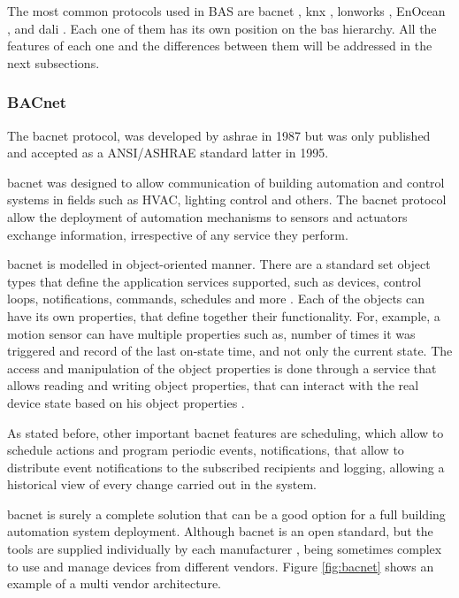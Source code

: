 The most common protocols used in BAS are \acf{bacnet} \cite{bacnet}, \acf{knx} \cite{knx}, \acf{lonworks} \cite{EchelonCorporation2009}, EnOcean \cite{enocean}, and \acf{dali} \cite{dali}. Each one of them has its own position on the \ac{bas} hierarchy. All the features of each one and the differences between them will be addressed in the next subsections.


\subsubsection{BACnet}
The \acf{bacnet} protocol, was developed by \acf{ashrae} in 1987 but was only published and accepted as a ANSI/ASHRAE standard latter in 1995.

\ac{bacnet} was designed to allow communication of building automation and control systems in fields such as HVAC, lighting control and others. The \ac{bacnet} protocol allow the deployment of automation mechanisms to sensors and actuators exchange information, irrespective of any service they perform.

\ac{bacnet} is modelled in object-oriented manner. There are a standard set object types that define the application services supported, such as devices, control loops, notifications, commands, schedules and more \cite{Domingues2016}. Each of the objects can have its own properties, that define together their functionality. For, example, a motion sensor can have multiple properties such as, number of times it was triggered and record of the last on-state time, and not only the current state. The access and manipulation of the object properties is done through a service that allows reading and writing object properties, that can interact with the real device state based on his object properties \cite{Fernbach2011}.

As stated before, other important \ac{bacnet} features are scheduling, which allow to schedule actions and program periodic events, notifications, that allow to distribute event notifications to the subscribed recipients \cite{Domingues2016} and logging, allowing a historical view of every change carried out in the system.

\ac{bacnet} is surely a complete solution that can be a good option for a full building automation system deployment. Although \ac{bacnet} is an open standard, but the tools are supplied individually by each manufacturer \cite{openprotocol}, being sometimes complex to use and manage devices from different vendors. Figure \ref{fig:bacnet} shows an example of a multi vendor architecture.


